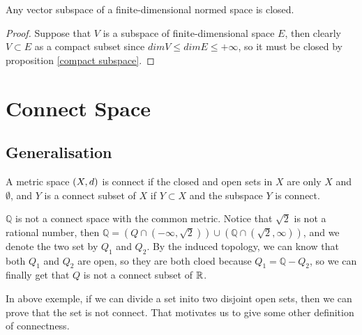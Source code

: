 \documentclass[en,hazy,blue,noraml,12pt]{elegantnote}
\begin{document}
\begin{corollary}
    Any vector subspace of a finite-dimensional normed space is closed.
    \begin{proof}
        Suppose that \(V\) is a subspace of finite-dimensional space \(E\), then clearly \(V \subset E\) as a compact subset since \(dimV \leq dimE \leq +\infty\), so it must be closed by proposition \ref{compact subspace}.
    \end{proof}
\end{corollary}



\section{Connect Space}
\subsection{Generalisation}
\begin{definition}
    A metric space \((X,d)\) is connect if the closed and open sets in \(X\) are only \(X\) and \(\emptyset\), and \(Y\) is a connect subset of \(X\) if \(Y \subset X\) and the subspace \(Y\) is connect.

    \begin{example}
        \(\mathbb{Q}\) is not a connect space with the common metric. Notice that \(\sqrt{2}\) is not a rational number, then \(\mathbb{Q} = (Q \cap (-\infty,\sqrt{2})) \cup (\mathbb{Q} \cap (\sqrt{2},\infty))\), and we denote the two set by \(Q_1\) and \(Q_2\). By the induced topology, we can know that both \(Q_1\) and \(Q_2\) are open, so they are both cloed because \(Q_1 = \mathbb{Q}-Q_2\), so we can finally get that \(Q\) is not a connect subset of \(\mathbb{R}\).
    \end{example}
\end{definition}

In above exemple, if we can divide a set inito two disjoint open sets, then we can prove that the set is not connect. That motivates us to give some other definition of connectness.
\end{document}
